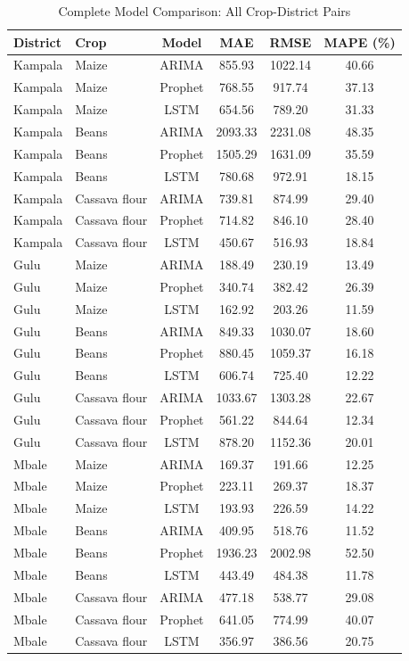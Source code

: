 \documentclass[12pt,a4paper]{article}
\begin{document}
\begin{table}[H]
\centering
\caption{Complete Model Comparison: All Crop-District Pairs}
\label{tab:full_results}
\small
\begin{tabular}{llcccc}
\toprule
\textbf{District} & \textbf{Crop} & \textbf{Model} & \textbf{MAE} & \textbf{RMSE} & \textbf{MAPE (\%)} \\
\midrule
Kampala & Maize & ARIMA & 855.93 & 1022.14 & 40.66 \\
Kampala & Maize & Prophet & 768.55 & 917.74 & 37.13 \\
Kampala & Maize & LSTM & 654.56 & 789.20 & 31.33 \\
\midrule
Kampala & Beans & ARIMA & 2093.33 & 2231.08 & 48.35 \\
Kampala & Beans & Prophet & 1505.29 & 1631.09 & 35.59 \\
Kampala & Beans & LSTM & 780.68 & 972.91 & 18.15 \\
\midrule
Kampala & Cassava flour & ARIMA & 739.81 & 874.99 & 29.40 \\
Kampala & Cassava flour & Prophet & 714.82 & 846.10 & 28.40 \\
Kampala & Cassava flour & LSTM & 450.67 & 516.93 & 18.84 \\
\midrule
Gulu & Maize & ARIMA & 188.49 & 230.19 & 13.49 \\
Gulu & Maize & Prophet & 340.74 & 382.42 & 26.39 \\
Gulu & Maize & LSTM & 162.92 & 203.26 & 11.59 \\
\midrule
Gulu & Beans & ARIMA & 849.33 & 1030.07 & 18.60 \\
Gulu & Beans & Prophet & 880.45 & 1059.37 & 16.18 \\
Gulu & Beans & LSTM & 606.74 & 725.40 & 12.22 \\
\midrule
Gulu & Cassava flour & ARIMA & 1033.67 & 1303.28 & 22.67 \\
Gulu & Cassava flour & Prophet & 561.22 & 844.64 & 12.34 \\
Gulu & Cassava flour & LSTM & 878.20 & 1152.36 & 20.01 \\
\midrule
Mbale & Maize & ARIMA & 169.37 & 191.66 & 12.25 \\
Mbale & Maize & Prophet & 223.11 & 269.37 & 18.37 \\
Mbale & Maize & LSTM & 193.93 & 226.59 & 14.22 \\
\midrule
Mbale & Beans & ARIMA & 409.95 & 518.76 & 11.52 \\
Mbale & Beans & Prophet & 1936.23 & 2002.98 & 52.50 \\
Mbale & Beans & LSTM & 443.49 & 484.38 & 11.78 \\
\midrule
Mbale & Cassava flour & ARIMA & 477.18 & 538.77 & 29.08 \\
Mbale & Cassava flour & Prophet & 641.05 & 774.99 & 40.07 \\
Mbale & Cassava flour & LSTM & 356.97 & 386.56 & 20.75 \\
\bottomrule
\end{tabular}
\end{table}
\end{document}
